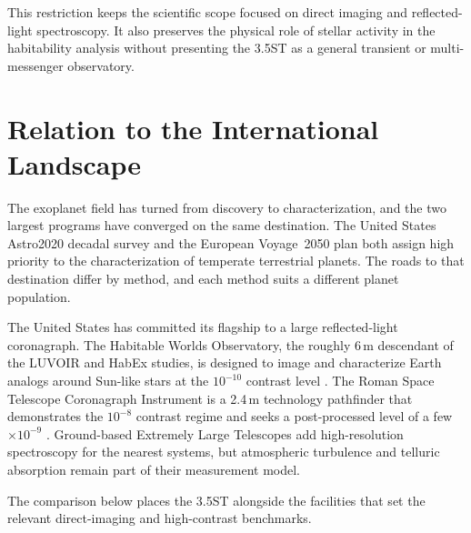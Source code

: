 This restriction keeps the scientific scope focused on direct imaging and
reflected-light spectroscopy. It also preserves the physical role of stellar
activity in the habitability analysis without presenting the 3.5ST as a
general transient or multi-messenger observatory.

\section{Relation to the International Landscape}
\label{sec:landscape}

The exoplanet field has turned from discovery to characterization, and
the two largest programs have converged on the same destination. The
United States Astro2020 decadal survey \cite{astro2020} and the
European Voyage~2050 plan \cite{voyage2050} both assign high priority
to the characterization of temperate terrestrial planets. The roads
to that destination differ by method, and each
method suits a different planet population.

The United States has committed its flagship to a large reflected-light
coronagraph. The Habitable Worlds Observatory, the roughly 6\,m descendant
of the LUVOIR and HabEx studies, is designed to image and characterize
Earth analogs around Sun-like stars at the $10^{-10}$ contrast level
\cite{astro2020,hwo26}. The Roman Space Telescope Coronagraph Instrument is
a 2.4\,m technology pathfinder that demonstrates the $10^{-8}$ contrast
regime and seeks a post-processed level of a few $\times10^{-9}$
\cite{bailey23,llopsayson25}. Ground-based Extremely Large Telescopes add
high-resolution spectroscopy for the nearest systems, but atmospheric
turbulence and telluric absorption remain part of their measurement model.

The comparison below places the 3.5ST alongside the facilities that set the
relevant direct-imaging and high-contrast benchmarks.

